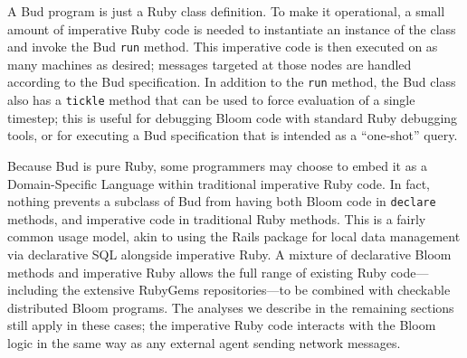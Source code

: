 A Bud program is just a Ruby class definition.  To make it operational, a small amount of imperative Ruby code is needed to instantiate an instance of the class and invoke the Bud \texttt{run} method.  This imperative code is then executed on as many machines as desired; messages targeted at those nodes are handled according to the Bud specification.  In addition to the \texttt{run} method, the Bud class also has a \texttt{tickle} method that can be used to force evaluation of a single timestep; this is useful for debugging Bloom code with standard Ruby debugging tools, or for executing a Bud specification that is intended as a ``one-shot'' query.

Because Bud is pure Ruby, some programmers may choose to embed it as a Domain-Specific Language within traditional imperative Ruby code.  In fact, nothing prevents a subclass of Bud from having both Bloom code in \texttt{declare} methods, and imperative code in traditional Ruby methods.  This is a fairly common usage model, akin to using the Rails package for local data management via declarative SQL alongside imperative Ruby. A mixture of declarative Bloom methods and imperative Ruby allows the full range of existing Ruby code---including the extensive RubyGems repositories---to be combined with checkable distributed Bloom programs. The analyses we describe in the remaining sections still apply in these cases; the imperative Ruby code interacts with the Bloom logic in the same way as any external agent sending network messages.
